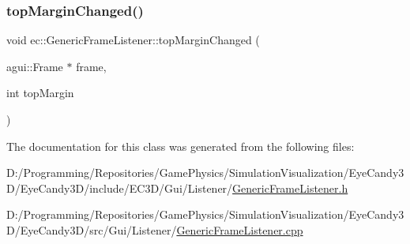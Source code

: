 \subsubsection{\texorpdfstring{top\+Margin\+Changed()}{topMarginChanged()}}
{\footnotesize\ttfamily void ec\+::\+Generic\+Frame\+Listener\+::top\+Margin\+Changed (\begin{DoxyParamCaption}\item[{agui\+::\+Frame $\ast$}]{frame,  }\item[{int}]{top\+Margin }\end{DoxyParamCaption})\hspace{0.3cm}{\ttfamily [override]}}



The documentation for this class was generated from the following files\+:\begin{DoxyCompactItemize}
\item 
D\+:/\+Programming/\+Repositories/\+Game\+Physics/\+Simulation\+Visualization/\+Eye\+Candy3\+D/\+Eye\+Candy3\+D/include/\+E\+C3\+D/\+Gui/\+Listener/\mbox{\hyperlink{_generic_frame_listener_8h}{Generic\+Frame\+Listener.\+h}}\item 
D\+:/\+Programming/\+Repositories/\+Game\+Physics/\+Simulation\+Visualization/\+Eye\+Candy3\+D/\+Eye\+Candy3\+D/src/\+Gui/\+Listener/\mbox{\hyperlink{_generic_frame_listener_8cpp}{Generic\+Frame\+Listener.\+cpp}}\end{DoxyCompactItemize}
